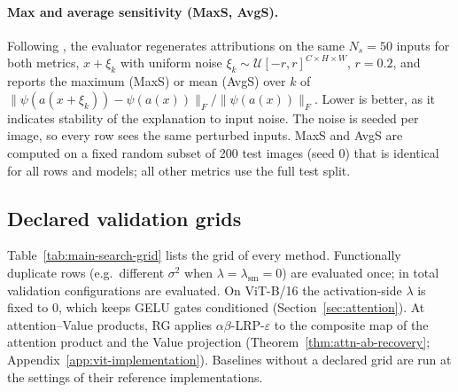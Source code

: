\documentclass[twoside]{article}
\newcommand{\1}{\mathbf{1}}
\begin{document}
\paragraph{Max and average sensitivity (MaxS, AvgS).} Following \citet{yeh2019fidelity}, the evaluator regenerates attributions on the same $N_s = 50$
inputs for both metrics, $x + \xi_k$ with uniform noise $\xi_k \sim \mathcal{U}[-r, r]^{C \times H
    \times W}$, $r = 0.2$, and reports the maximum (MaxS) or mean (AvgS) over $k$ of
$\|\psi(a(x+\xi_k)) - \psi(a(x))\|_F / \|\psi(a(x))\|_F$. Lower is better, as it indicates
stability of the explanation to input noise.
The noise is seeded per image, so every row sees the same perturbed inputs. MaxS and AvgS are
computed on a fixed random subset of 200 test images (seed 0) that is identical for all rows and
models; all other metrics use the full test split.

\subsection{Declared validation grids}\label{app:grids}

Table~\ref{tab:main-search-grid} lists the grid of every method. Functionally duplicate rows (e.g.\
different $\sigma^2$ when $\lambda = \lambda_{\mathrm{sm}} = 0$) are evaluated once; in total
\nValGrid{} validation configurations are evaluated. On ViT-B/16 the activation-side $\lambda$ is
fixed to $0$, which keeps GELU gates conditioned (Section~\ref{sec:attention}). At attention--Value
products, \ac{RG} applies $\alpha\beta$-\ac{LRP}-$\varepsilon$ to the composite map of the
attention product and the Value projection (Theorem~\ref{thm:attn-ab-recovery};
Appendix~\ref{app:vit-implementation}). Baselines without a declared grid are run at the settings
of their reference implementations.
\end{document}
